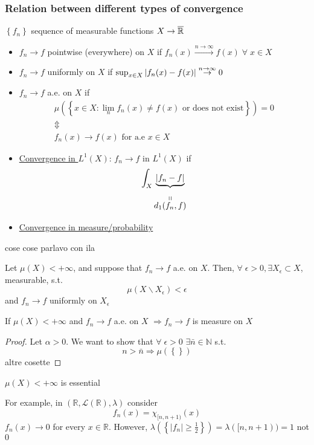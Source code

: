 \subsubsection*{Relation between different types of convergence}
\(\left\lbrace f_n \right\rbrace\) sequence of measurable functions \(X \to \overline{\mathbb{R}}\)
\begin{itemize}
    \item \(f_n \to f\) pointwise (everywhere) on \(X\) if \(f_n(x) \overset{n \to \infty}{\to} f(x) \; \forall \; x \in X\)
    \item \(f_n \to f\) uniformly on \(X\) if \(\sup_{x \in X} \abs{f_n(x) - f(x)} \overset{n \to \infty}{\to} 0\)
    \item \(f_n \to f\) a.e. on \(X\) if 
    \[
        \begin{array}{c}
            \mu\left(\left\{ x \in X : \lim_n f_n(x) \neq f(x) \mbox{ or does not exist} \right\}\right) = 0 \\
            \Updownarrow \\
            f_n(x) \to f(x) \mbox{ for a.e } x \in X
        \end{array}
    \]
    \item \underline{Convergence in \(L^1(X)\)}: \(f_n \to f\) in \(L^1(X)\) if 
    \[
        \int_X \underbrace{\abs{f_n - f}}_{\underset{\displaystyle\overset{\displaystyle\shortparallel}{d_1(f_n, f)}}{}}
    \]
    \item \underline{Convergence in measure/probability}
\end{itemize}
cose cose parlavo con ila 
\begin{theorem}[Egorov]
    Let \(\mu(X) < +\infty\), and suppose that \(f_n \to f\) a.e. on \(X\). Then, \(\forall \; \epsilon > 0, \exists X_{\epsilon} \subset X\), measurable, s.t. 
    \[
        \mu(X \backslash X_{\epsilon}) < \epsilon
    \]
    and \(f_n \to f\) uniformly on \(X_{\epsilon}\)
\end{theorem}
\begin{theorem}
    If \(\mu(X) < +\infty\) and \(f_n \to f\) a.e. on \(X\) \(\Longrightarrow f_n \to f\) is measure on \(X\)
\end{theorem}
\begin{proof}
    Let \(\alpha > 0\). We want to show that \(\forall \; \epsilon > 0\) \(\exists \bar{n} \in \mathbb{N}\) s.t. 
    \[
        n > \bar{n} \Longrightarrow \mu(\left\lbrace \right\rbrace)
    \]
    altre cosette 
\end{proof}
\begin{remark}
    \(\mu(X) < +\infty\) is essential
\end{remark}
For example, in \((\mathbb{R}, \mathcal{L}(\mathbb{R}), \lambda)\) consider
\[
    f_n (x) = \chi_{[n, n+1)}(x)
\]
\(f_n(x) \to 0\) for every \(x \in \mathbb{R}\). However, \(\lambda(\left\lbrace \vert f_n \vert \geq \frac{1}{2}\right\rbrace) = \lambda([n, n+1)) = 1\) not \(0\)
